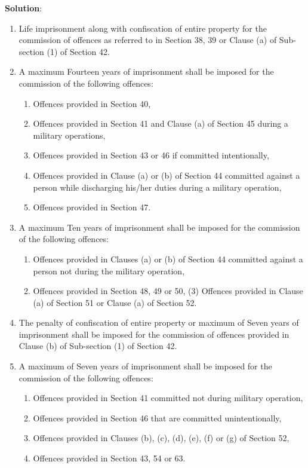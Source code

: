 \documentclass[
  openany]{book}
\newenvironment{solution}{ {\bfseries Solution}:}{}
\begin{document}
\begin{questions}
\begin{solution}
\begin{enumerate}
  \item Life imprisonment along with confiscation of entire property for the commission of offences as referred to in Section 38, 39 or Clause (a) of Sub-section (1) of Section 42.
  \item A maximum Fourteen years of imprisonment shall be imposed for the commission of the following offences:
  \begin{enumerate}
    \item Offences provided in Section 40,
    \item Offences provided in Section 41 and Clause (a) of Section 45 during a military operations,
    \item Offences provided in Section 43 or 46 if committed intentionally,
    \item Offences provided in Clause (a) or (b) of Section 44 committed against a person while discharging his/her duties during a military operation,
    \item Offences provided in Section 47.
  \end{enumerate}
  \item A maximum Ten years of imprisonment shall be imposed for the commission of the following offences:
  \begin{enumerate}
    \item Offences provided in Clauses (a) or (b) of Section 44 committed against a person not during the military operation,
    \item Offences provided in Section 48, 49 or 50, (3) Offences provided in Clause (a) of Section 51 or Clause (a) of Section 52.
  \end{enumerate}
  \item The penalty of confiscation of entire property or maximum of Seven years of imprisonment shall be imposed for the commission of offences provided in Clause (b) of Sub-section (1) of Section 42.
  \item A maximum of Seven years of imprisonment shall be imposed for the commission of the following offences:
  \begin{enumerate}
    \item Offences provided in Section 41 committed not during military operation,
    \item Offences provided in Section 46 that are committed unintentionally,
    \item Offences provided in Clauses (b), (c), (d), (e), (f) or (g) of Section 52,
    \item Offences provided in Section 43, 54 or 63.

\end{enumerate}
\end{enumerate}
\end{solution}
\end{questions}
\end{document}
